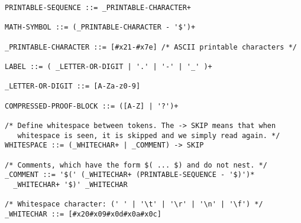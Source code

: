 \begin{verbatim}
PRINTABLE-SEQUENCE ::= _PRINTABLE-CHARACTER+

MATH-SYMBOL ::= (_PRINTABLE-CHARACTER - '$')+

_PRINTABLE-CHARACTER ::= [#x21-#x7e] /* ASCII printable characters */

LABEL ::= ( _LETTER-OR-DIGIT | '.' | '-' | '_' )+

_LETTER-OR-DIGIT ::= [A-Za-z0-9]

COMPRESSED-PROOF-BLOCK ::= ([A-Z] | '?')+

/* Define whitespace between tokens. The -> SKIP means that when
   whitespace is seen, it is skipped and we simply read again. */
WHITESPACE ::= (_WHITECHAR+ | _COMMENT) -> SKIP

/* Comments, which have the form $( ... $) and do not nest. */
_COMMENT ::= '$(' (_WHITECHAR+ (PRINTABLE-SEQUENCE - '$)')*
  _WHITECHAR+ '$)' _WHITECHAR

/* Whitespace character: (' ' | '\t' | '\r' | '\n' | '\f') */
_WHITECHAR ::= [#x20#x09#x0d#x0a#x0c]
\end{verbatim}
%
%
%
%
%
%
\cleardoublepage
{}  %


%

\raggedright
\cleardoublepage
{} %




